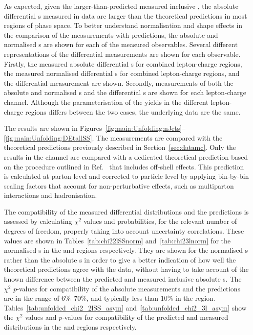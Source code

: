 \documentclass[cernpreprint, atlasdraft=false, texlive=2023, UKenglish, texmf, orcidlogo]{atlasdoc}
\begin{document}
As expected, given the larger-than-predicted measured inclusive \xs, the absolute
differential \xs{}s measured in data are larger than the theoretical
predictions in most regions of phase space. To better understand normalisation and shape effects in the
comparison of the measurements with predictions, the absolute and
normalised \xs{}s are shown for each of the measured observables.
Several different representations of the differential \xs
measurements are shown for each observable. Firstly, the measured
absolute differential \xs{}s for combined lepton-charge regions, the
measured normalised differential \xs{}s for combined lepton-charge regions,
and the differential \rqasym measurement are shown.
Secondly, measurements of both the absolute and normalised \xs{}s and
the differential \xs{}s are shown for each lepton-charge channel.
Although the parameterisation of the yields in the different lepton-charge regions
differs between the two cases, the underlying data are the same.
 
The results are shown in
Figures~\ref{fig:main:Unfolding:nJets}--\ref{fig:main:Unfolding:DEtallSS}.
The measurements are compared with the theoretical predictions
previously described in Section~\ref{sec:datamc}. Only the results in
the \lll channel are compared with a dedicated theoretical prediction
based on the procedure outlined in Ref.~\cite{Bevilacqua:2020srb} that
includes off-shell effects. This prediction is calculated at
parton level and corrected to particle level by applying bin-by-bin
scaling factors that account for non-perturbative effects, such as multiparton
interactions and hadronisation.
 
The compatibility of the measured differential \xs distributions and the
predictions is assessed by calculating $\chi^2$ values and probabilities,
for the relevant number of degrees of freedom, properly taking into
account uncertainty correlations. These values are shown in
Tables~\ref{tab:chi22lSSnorm} and~\ref{tab:chi23lnorm} for the
normalised \xs{}s in the \llSS and \lll regions respectively.
They are shown for the normalised \xs{}s rather than the absolute \xs{}s
in order to give a better indication of how well the theoretical predictions
agree with the data, without having to take account of the known
difference between the predicted and measured inclusive absolute \xs{}s.
The $\chi^2$ $p$-values for compatibility of the absolute \xs measurements
and the \SHERPA predictions are in the range of 6\%--70\%, and typically
less than 10\% in the \llSS region.
Tables~\ref{tab:unfolded_chi2_2lSS_asym} and~\ref{tab:unfolded_chi2_3l_asym}
show the $\chi^2$ values and $p$-values for compatibility of the predicted and
measured \rqasym distributions in the \llSS and \lll regions respectively.
 
\end{document}
